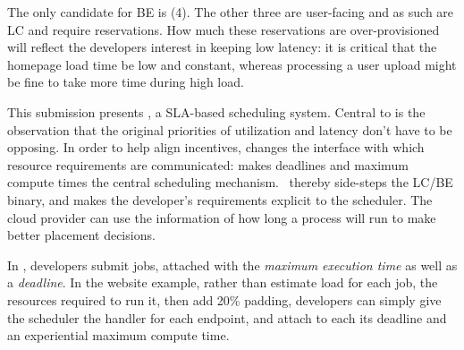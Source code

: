The only candidate for BE is (4). The other three are user-facing and as such
are LC and require reservations. How much these reservations are
over-provisioned will reflect the developers interest in keeping low latency: it
is critical that the homepage load time be low and constant, whereas processing
a user upload might be fine to take more time during high load.

This submission presents \textit{\sysname}, a SLA-based scheduling system.
Central to \sysname{} is the observation that the original priorities of
utilization and latency don't have to be opposing. In order to help align
incentives, \sysname{} changes the interface with which resource requirements
are communicated: \sysname{} makes deadlines and maximum compute times the
central scheduling mechanism.\ \sysname{} thereby side-steps the LC/BE binary,
and makes the developer's requirements explicit to the scheduler. The cloud
provider can use the information of how long a process will run to make better
placement decisions.

In \sysname{}, developers submit jobs, attached with the \textit{maximum
execution time} as well as a \textit{deadline}. In the website example, rather
than estimate load for each job, the resources required to run it, then add 20\%
padding, developers can simply give the scheduler the handler for each endpoint,
and attach to each its deadline and an experiential maximum compute time.